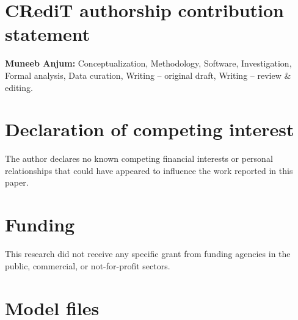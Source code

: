 \documentclass[preprint,10pt,a4paper]{elsarticle}
\begin{document}
\section*{CRediT authorship contribution statement}
\textbf{Muneeb Anjum:} Conceptualization, Methodology, Software, Investigation, Formal analysis, Data curation, Writing -- original draft, Writing -- review \& editing.

\section*{Declaration of competing interest}
The author declares no known competing financial interests or personal relationships that could have appeared to influence the work reported in this paper.

\section*{Funding}
This research did not receive any specific grant from funding agencies in the public, commercial, or not-for-profit sectors.




\appendix
\section{Model files}\label{app:hashes}

\end{document}
